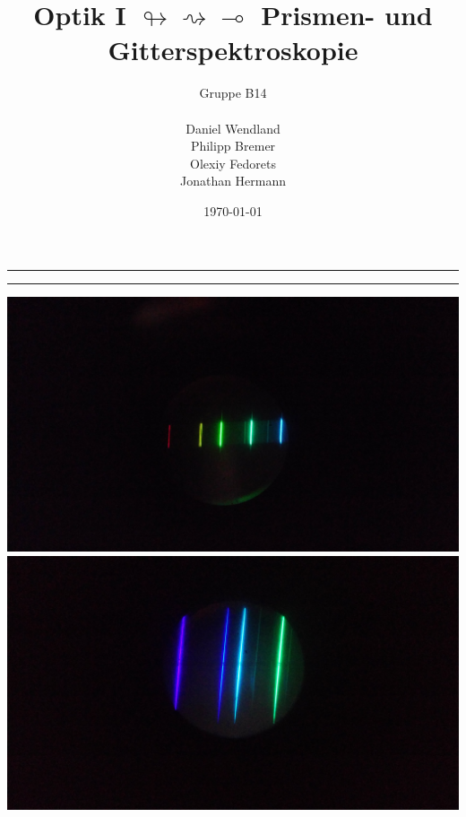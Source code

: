 \documentclass[a4paper, 11pt]{article}
\title{Optik I $\looparrowright\rightsquigarrow\multimap$ Prismen- und Gitterspektroskopie}
\author{Gruppe B14 \\ \\ Daniel Wendland \\ Philipp Bremer \\ Olexiy Fedorets \\ Jonathan Hermann}
\date{\today}
\begin{document}
\begin{titlepage}
\vspace*{\fill}
\begin{center}
	\textheight
	\vfill
	\newcommand{\Line}{\rule{\linewidth}{0.6mm}}
	\Line 
	{\let\newpage\relax\maketitle}
	\Line 
	\vfill
\end{center}


\begin{center}
	\includegraphics[trim={1cm 1cm 1cm 1cm},clip=true,scale=0.08]{Bilder/IMG_20170915_131423.jpg}  
	\textwidth
	\includegraphics[trim={1cm 1cm 1cm 1cm},clip=true,scale=0.08]{Bilder/IMG_20170915_131047.jpg}  
\end{center}

\vspace*{\fill}
\thispagestyle{empty}
\end{titlepage}
\end{document}
